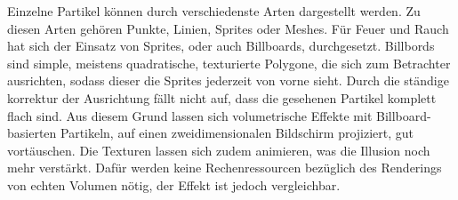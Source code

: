 Einzelne Partikel können durch verschiedenste Arten dargestellt werden. Zu diesen Arten gehören Punkte, Linien, Sprites oder Meshes.
Für Feuer und Rauch hat sich der Einsatz von Sprites, oder auch Billboards, durchgesetzt. Billbords sind simple, meistens quadratische, texturierte Polygone,
die sich zum Betrachter ausrichten, sodass dieser die Sprites jederzeit von vorne sieht. Durch die ständige korrektur der Ausrichtung fällt
nicht auf, dass die gesehenen Partikel komplett flach sind. Aus diesem Grund lassen sich volumetrische Effekte mit Billboard-basierten Partikeln, 
auf einen zweidimensionalen Bildschirm projiziert, gut vortäuschen.  Die Texturen lassen sich zudem animieren, was die Illusion noch mehr verstärkt.  
Dafür werden keine Rechenressourcen bezüglich des Renderings von echten Volumen nötig, der Effekt ist jedoch vergleichbar.
